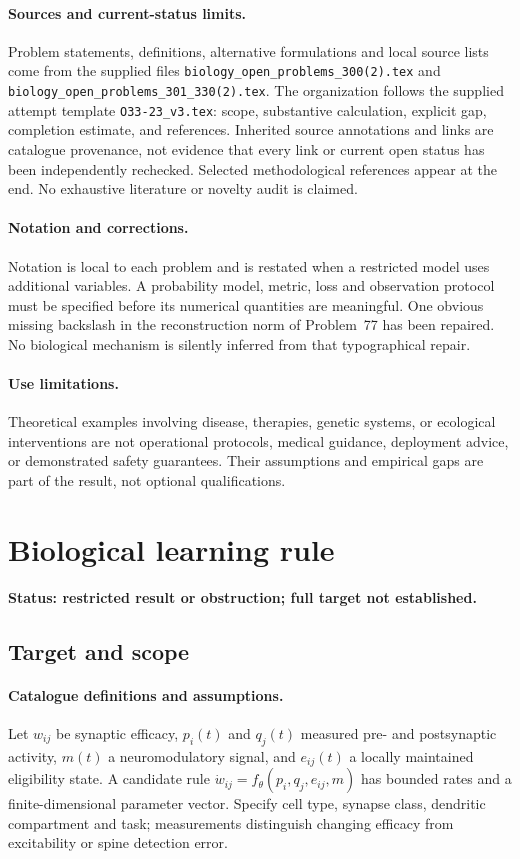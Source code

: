 \documentclass[11pt]{article}
\begin{document}
\paragraph{Sources and current-status limits.}
Problem statements, definitions, alternative formulations and local source lists
come from the supplied files
\texttt{biology\_open\_problems\_300(2).tex} and
\texttt{biology\_open\_problems\_301\_330(2).tex}.
The organization follows the supplied attempt template
\texttt{O33-23\_v3.tex}: scope, substantive calculation, explicit gap,
completion estimate, and references. Inherited source annotations and links are
catalogue provenance, not evidence that every link or current open status has
been independently rechecked. Selected methodological references appear at the
end. No exhaustive literature or novelty audit is claimed.

\paragraph{Notation and corrections.}
Notation is local to each problem and is restated when a restricted model uses
additional variables. A probability model, metric, loss and observation protocol
must be specified before its numerical quantities are meaningful. One obvious
missing backslash in the reconstruction norm of Problem~77 has been repaired.
No biological mechanism is silently inferred from that typographical repair.

\paragraph{Use limitations.}
Theoretical examples involving disease, therapies, genetic systems, or ecological
interventions are not operational protocols, medical guidance, deployment advice,
or demonstrated safety guarantees. Their assumptions and empirical gaps are part
of the result, not optional qualifications.


\section*{Biological learning rule}
\label{prob:105}
\noindent\textbf{Status: restricted result or obstruction; full target not established.}
\subsection{Target and scope}
\paragraph{Catalogue definitions and assumptions.}
Let $w_{ij}$ be synaptic efficacy, $p_i(t)$ and $q_j(t)$ measured pre- and postsynaptic activity, $m(t)$ a neuromodulatory signal, and $e_{ij}(t)$ a locally maintained eligibility state. A candidate rule $\dot w_{ij}=f_\theta(p_i,q_j,e_{ij},m)$ has bounded rates and a finite-dimensional parameter vector. Specify cell type, synapse class, dendritic compartment and task; measurements distinguish changing efficacy from excitability or spine detection error.
\end{document}
